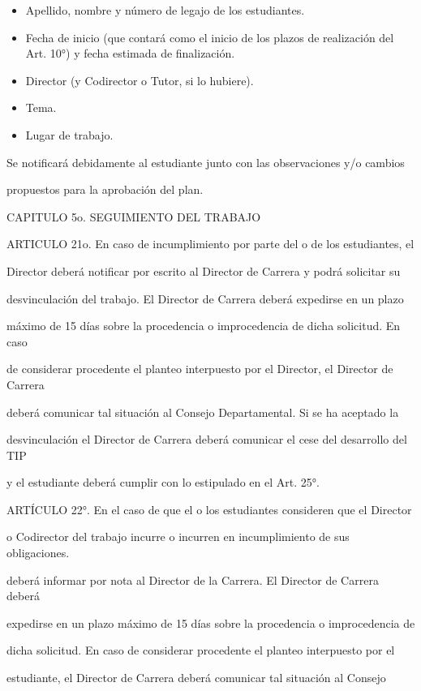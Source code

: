 \documentclass[a4paper,12pt]{article}
\begin{document}
\begin{itemize}
 \item Apellido, nombre y número de legajo de los estudiantes.
 \item Fecha de inicio (que contará como el inicio de los plazos de
 realización del Art. 10°) y fecha estimada de finalización.
 \item Director (y Codirector o Tutor, si lo hubiere).
 \item Tema.
 \item Lugar de trabajo.
\end{itemize}

Se notificará debidamente al estudiante junto con las observaciones y/o cambios

propuestos para la aprobación del plan.

CAPITULO 5o. SEGUIMIENTO DEL TRABAJO

ARTICULO 21o. En caso de incumplimiento por parte del o de los estudiantes, el

Director deberá notificar por escrito al Director de Carrera y podrá solicitar su

desvinculación del trabajo. El Director de Carrera deberá expedirse en un plazo

máximo de 15 días sobre la procedencia o improcedencia de dicha solicitud. En caso

de considerar procedente el planteo interpuesto por el Director, el Director de Carrera

deberá comunicar tal situación al Consejo Departamental. Si se ha aceptado la

desvinculación el Director de Carrera deberá comunicar el cese del desarrollo del TIP

y el estudiante deberá cumplir con lo estipulado en el Art. 25°.

ARTÍCULO 22°. En el caso de que el o los estudiantes consideren que el Director

o Codirector del trabajo incurre o incurren en incumplimiento de sus obligaciones.

deberá informar por nota al Director de la Carrera. El Director de Carrera deberá

expedirse en un plazo máximo de 15 días sobre la procedencia o improcedencia de

dicha solicitud. En caso de considerar procedente el planteo interpuesto por el

estudiante, el Director de Carrera deberá comunicar tal situación al Consejo
\end{document}
